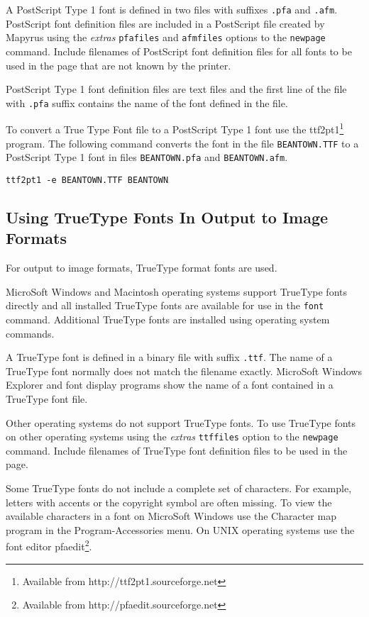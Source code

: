 A PostScript Type 1 font is defined in two files with suffixes
\texttt{.pfa} and \texttt{.afm}.  PostScript
font definition files are included in a PostScript file created
by Mapyrus using the
\textit{extras} \texttt{pfafiles} and \texttt{afmfiles}
options to the \texttt{newpage} command.
Include filenames of PostScript font definition files for all fonts to be used
in the page that are not known by the printer.

PostScript Type 1 font definition files are text files and
the first line of the file with \texttt{.pfa} suffix
contains the name of the font defined in the file.

To convert a True Type Font file to a PostScript Type 1 font use the
ttf2pt1\footnote{Available from http://ttf2pt1.sourceforge.net} program.  The
following command converts the font in the file \texttt{BEANTOWN.TTF} to a
PostScript Type 1 font in files
\texttt{BEANTOWN.pfa} and
\texttt{BEANTOWN.afm}.

\begin{verbatim}
ttf2pt1 -e BEANTOWN.TTF BEANTOWN
\end{verbatim}

\subsection{Using TrueType Fonts In Output to Image Formats}
\label{ttffonts}

For output to image formats, TrueType format fonts are used.

MicroSoft Windows and Macintosh operating systems support TrueType
fonts directly and all installed TrueType fonts are available
for use in the \texttt{font} command.
Additional TrueType fonts are installed using operating system commands.

A TrueType font is defined in a binary file with suffix
\texttt{.ttf}.
The name of a TrueType font normally does not match the filename exactly.
MicroSoft Windows Explorer and font display programs show the name of
a font contained in a TrueType font file.

Other operating systems do not support TrueType fonts.  To use TrueType fonts
on other operating systems using the \textit{extras} \texttt{ttffiles} option
to the \texttt{newpage} command.  Include filenames of TrueType font definition
files to be used in the page.

Some TrueType fonts do not include a complete set of characters.
For example, letters with accents or the copyright symbol are often
missing.  To view the available characters in a font on MicroSoft Windows
use the Character map program in the Program-Accessories
menu.  On UNIX operating systems use the font editor
pfaedit\footnote{Available from http://pfaedit.sourceforge.net}.

